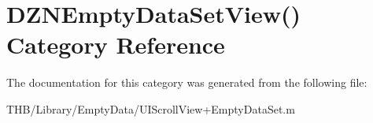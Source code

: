 \hypertarget{category_d_z_n_empty_data_set_view_07_08}{}\section{D\+Z\+N\+Empty\+Data\+Set\+View() Category Reference}
\label{category_d_z_n_empty_data_set_view_07_08}


The documentation for this category was generated from the following file\+:\begin{DoxyCompactItemize}
\item 
T\+H\+B/\+Library/\+Empty\+Data/U\+I\+Scroll\+View+\+Empty\+Data\+Set.\+m\end{DoxyCompactItemize}

